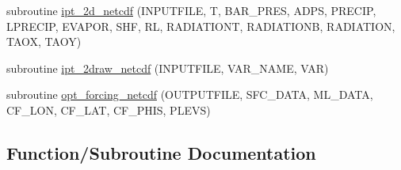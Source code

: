 \begin{DoxyCompactItemize}
\item 
subroutine \hyperlink{namespaceio_aff87bbb9c43d6db1fedd086586aab0c6}{ipt\+\_\+2d\+\_\+netcdf} (I\+N\+P\+U\+T\+F\+I\+LE, T, B\+A\+R\+\_\+\+P\+R\+ES, A\+D\+PS, P\+R\+E\+C\+IP, L\+P\+R\+E\+C\+IP, E\+V\+A\+P\+OR, S\+HF, RL, R\+A\+D\+I\+A\+T\+I\+O\+NT, R\+A\+D\+I\+A\+T\+I\+O\+NB, R\+A\+D\+I\+A\+T\+I\+ON, T\+A\+OX, T\+A\+OY)
\item 
subroutine \hyperlink{namespaceio_ac91ebbbf1426451d33f3e32b08f70aee}{ipt\+\_\+2draw\+\_\+netcdf} (I\+N\+P\+U\+T\+F\+I\+LE, V\+A\+R\+\_\+\+N\+A\+ME, V\+AR)
\item 
subroutine \hyperlink{namespaceio_a50ab1073758d8d341087a0755354011d}{opt\+\_\+forcing\+\_\+netcdf} (O\+U\+T\+P\+U\+T\+F\+I\+LE, S\+F\+C\+\_\+\+D\+A\+TA, M\+L\+\_\+\+D\+A\+TA, C\+F\+\_\+\+L\+ON, C\+F\+\_\+\+L\+AT, C\+F\+\_\+\+P\+H\+IS, P\+L\+E\+VS)
\end{DoxyCompactItemize}


\subsection{Function/\+Subroutine Documentation}
